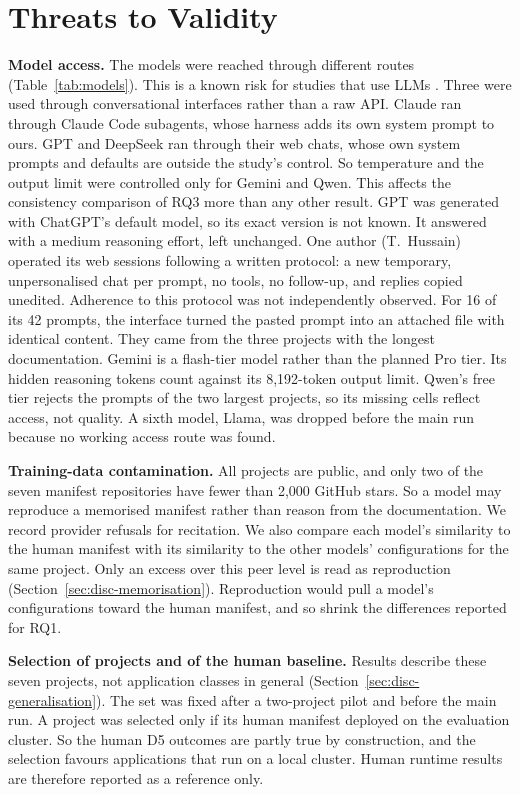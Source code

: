 \section{Threats to Validity}\label{sec:threats}

\textbf{Model access.} The models were reached through different routes (Table~\ref{tab:models}). This is a known risk for studies that use LLMs \citep{sallou2024breaking}. Three were used through conversational interfaces rather than a raw API. Claude ran through Claude Code subagents, whose harness adds its own system prompt to ours. GPT and DeepSeek ran through their web chats, whose own system prompts and defaults are outside the study's control. So temperature and the output limit were controlled only for Gemini and Qwen. This affects the consistency comparison of RQ3 more than any other result. GPT was generated with ChatGPT's default model, so its exact version is not known. It answered with a medium reasoning effort, left unchanged. One author (T.~Hussain) operated its web sessions following a written protocol: a new temporary, unpersonalised chat per prompt, no tools, no follow-up, and replies copied unedited. Adherence to this protocol was not independently observed. For 16 of its 42 prompts, the interface turned the pasted prompt into an attached file with identical content. They came from the three projects with the longest documentation. Gemini is a flash-tier model rather than the planned Pro tier. Its hidden reasoning tokens count against its 8,192-token output limit. Qwen's free tier rejects the prompts of the two largest projects, so its missing cells reflect access, not quality. A sixth model, Llama, was dropped before the main run because no working access route was found.

\textbf{Training-data contamination.} All projects are public, and only two of the seven manifest repositories have fewer than 2,000 GitHub stars. So a model may reproduce a memorised manifest rather than reason from the documentation. We record provider refusals for recitation. We also compare each model's similarity to the human manifest with its similarity to the other models' configurations for the same project. Only an excess over this peer level is read as reproduction (Section~\ref{sec:disc-memorisation}). Reproduction would pull a model's configurations toward the human manifest, and so shrink the differences reported for RQ1.

\textbf{Selection of projects and of the human baseline.} Results describe these seven projects, not application classes in general (Section~\ref{sec:disc-generalisation}). The set was fixed after a two-project pilot and before the main run. A project was selected only if its human manifest deployed on the evaluation cluster. So the human D5 outcomes are partly true by construction, and the selection favours applications that run on a local cluster. Human runtime results are therefore reported as a reference only.

